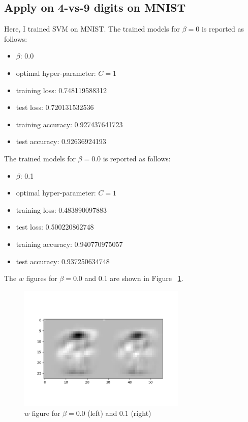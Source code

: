 \documentclass[a4paper]{article}
\begin{document}
\subsection{Apply on 4-vs-9 digits on MNIST}

Here, I trained SVM on MNIST. The trained models for $\beta=0$ is reported as follows:

\begin{itemize}
    \item $\beta$: 0.0
    \item optimal hyper-parameter: $C=1$
    \item training loss: 0.748119588312
    \item test loss: 0.720131532536
    \item training accuracy: 0.927437641723
    \item test accuracy: 0.92636924193
\end{itemize}

The trained models for $\beta=0.0$ is reported as follows:

\begin{itemize}
    \item $\beta$: 0.1
    \item optimal hyper-parameter: $C=1$
    \item training loss: 0.483890097883
    \item test loss: 0.500220862748
    \item training accuracy: 0.940770975057
    \item test accuracy: 0.937250634748
\end{itemize}

The $w$ figures for $\beta=0.0$ and $0.1$ are shown in Figure ~\ref{fig: SVM}.

\begin{figure}[htbp]
\centering
\includegraphics[width = 8cm]{SVM}
\caption{$w$ figure for $\beta=0.0$ (left) and $0.1$ (right)}
\label{fig: SVM}
\end{figure}
\end{document}
